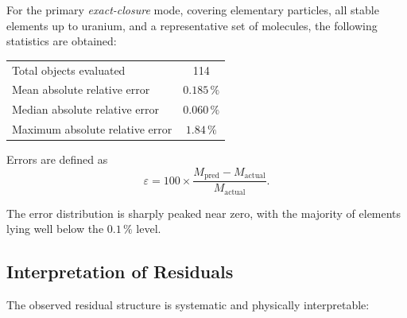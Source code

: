 \documentclass[11pt,a4paper]{article}
\begin{document}
            For the primary \emph{exact-closure} mode, covering elementary particles,
            all stable elements up to uranium, and a representative set of molecules,
            the following statistics are obtained:

            \begin{center}
                \begin{tabular}{l c}
                    \toprule
                    Total objects evaluated & 114 \\
                    Mean absolute relative error & $0.185\,\%$ \\
                    Median absolute relative error & $0.060\,\%$ \\
                    Maximum absolute relative error & $1.84\,\%$ \\
                    \bottomrule
                \end{tabular}
            \end{center}

            Errors are defined as
            \[
                \varepsilon = 100 \times \frac{M_{\mathrm{pred}} - M_{\mathrm{actual}}}{M_{\mathrm{actual}}}.
            \]

            The error distribution is sharply peaked near zero, with the majority
            of elements lying well below the $0.1\,\%$ level.

        \subsection{Interpretation of Residuals}

            The observed residual structure is systematic and physically interpretable:
\end{document}
